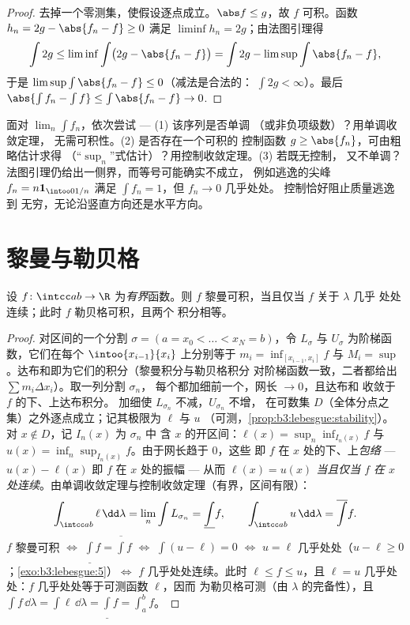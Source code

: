 \begin{proof}
去掉一个零测集，使假设逐点成立。$\abs f
\leq g$，故 $f$ 可积。函数 $h_n = 2g - \abs{f_n
- f} \geq 0$ 满足 $\liminf h_n = 2g$；由法图引理得
\[
\int 2g \leq \liminf\int\bigl(2g - \abs{f_n - f}\bigr)
= \int 2g - \limsup\int\abs{f_n - f},
\]
于是 $\limsup\int\abs{f_n - f} \leq 0$（减法是合法的：
$\int 2g < \infty$）。最后 $\abs{\int f_n - \int f} \leq
\int\abs{f_n - f} \to 0$.
\end{proof}

\begin{method}\label{met:b3:lebesgue:convergence}
面对 $\lim_n\int f_n$，依次尝试 --- (1) 该序列是否单调
（或非负项级数）？用单调收敛定理，
无需可积性。(2) 是否存在一个可积的
控制函数 $g \geq \abs{f_n}$，可由粗略估计求得
（“$\sup_n$”式估计）？用控制收敛定理。(3) 若既无控制，
又不单调？法图引理仍给出一侧界，而等号可能确实不成立，
例如逃逸的尖峰 $f_n = n\mathbf
1_{\intoo0{1/n}}$ 满足 $\int f_n = 1$，但 $f_n \to 0$ 几乎处处。
控制恰好阻止质量逃逸到
无穷，无论沿竖直方向还是水平方向。
\end{method}

\section{黎曼与勒贝格}

\begin{theorem}[勒贝格准则]
\label{thm:b3:lebesgue:riemann}
设 $f \colon \intcc ab \to \R$ 为\emph{有界}函数。则 $f$
黎曼可积，当且仅当 $f$ 关于 $\lambda$ 几乎
处处连续；此时 $f$ 勒贝格可积，且两个
积分相等。
\end{theorem}

\begin{proof}
对区间的一个分割 $\sigma = (a = x_0 < \dots < x_N = b)$，令
$L_\sigma$ 与 $U_\sigma$ 为阶梯函数，它们在每个
$\intoo{x_{i-1}}{x_i}$ 上分别等于 $m_i = \inf_{[x_{i-1}, x_i]}f$ 与
$M_i = \sup$。达布和即为它们的积分（黎曼积分与勒贝格积分
对阶梯函数一致，二者都给出 $\sum
m_i\Delta x_i$）。取一列分割 $\sigma_n$，
每个都加细前一个，网长 $\to 0$，且达布和
收敛于 $f$ 的下、上达布积分。
加细使 $L_{\sigma_n}$ 不减，$U_{\sigma_n}$ 不增，
在可数集
$D$（全体分点之集）之外逐点成立；记其极限为 $\ell$ 与 $u$
（可测，\cref{prop:b3:lebesgue:stability}）。对 $x \notin
D$，记 $I_n(x)$ 为 $\sigma_n$ 中
含 $x$ 的开区间：$\ell(x) = \sup_n\inf_{I_n(x)}f$ 与 $u(x) =
\inf_n\sup_{I_n(x)}f$。由于网长趋于 $0$，这些
即 $f$ 在 $x$ 处的下、上\emph{包络}
--- $u(x) - \ell(x)$ 即 $f$ 在 $x$ 处的振幅 --- 从而
\emph{$\ell(x) = u(x)$ 当且仅当 $f$ 在 $x$ 处连续}。由单调收敛定理与控制收敛定理（有界，区间有限）：
\[
\int_{\intcc ab}\ell\,\dd\lambda = \lim_n\int L_{\sigma_n}
= \underline{\int}f,
\qquad
\int_{\intcc ab}u\,\dd\lambda = \overline{\int}f .
\]
$f$ 黎曼可积 $\iff$ $\underline\int f =
\overline\int f$ $\iff$ $\int(u - \ell) = 0$ $\iff$ $u = \ell$
几乎处处（$u - \ell \geq 0$；\cref{exo:b3:lebesgue:5}）$\iff$ $f$
几乎处处连续。此时 $\ell \leq f \leq u$，且 $\ell =
u$ 几乎处处：$f$ 几乎处处等于可测函数 $\ell$，因而
为勒贝格可测（由 $\lambda$ 的完备性），且
$\int f\,\dd\lambda = \int\ell\,\dd\lambda = \underline\int f =
\int_a^bf$。
\end{proof}

